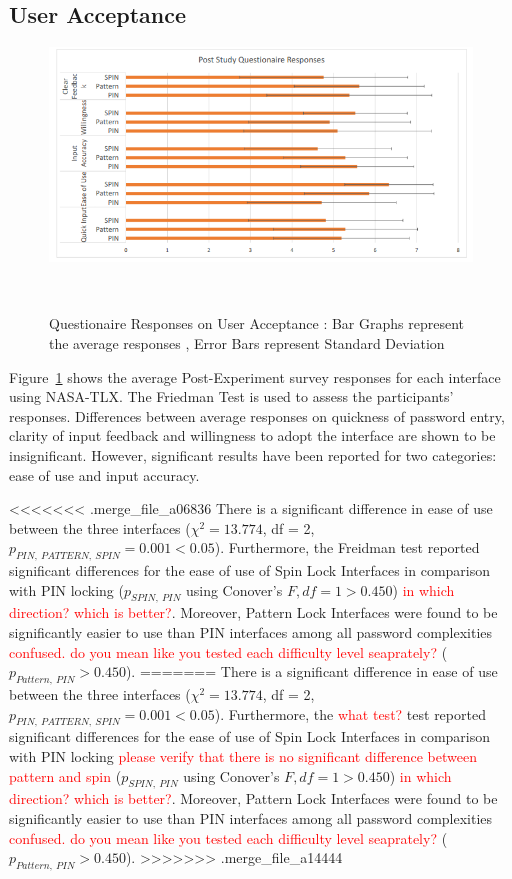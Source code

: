 \documentclass{sigchi}
\newcommand{\comment}[1]{\textcolor{red}{#1}}
\begin{document}
\subsection{User Acceptance}
\begin{figure}[b]
	\centering
	\includegraphics[width=1\columnwidth]{figures/Responses.png}
	\caption{Questionaire Responses on User Acceptance : Bar Graphs represent the average responses , Error Bars represent Standard Deviation}~\label{fig:Responses}
\end{figure}
 Figure~\ref{fig:Responses} shows the average Post-Experiment survey responses for each interface using NASA-TLX.  The Friedman Test is used to assess the participants' responses. Differences between average responses on quickness of password entry, clarity of input feedback and willingness to adopt the interface are shown to be insignificant. However, significant results have been reported for two categories: ease of use and input accuracy.

<<<<<<< .merge_file_a06836
There is a significant difference in ease of use between the three interfaces ($\chi^{2} = 13.774$, df = 2, $p_{PIN,\:PATTERN, \:SPIN} = 0.001 < 0.05$).  Furthermore, the Freidman test reported significant differences for the ease of use of Spin Lock  Interfaces in comparison with PIN locking   ($p_{SPIN,\:PIN}$ using Conover's $F, df = 1 >  0.450$) \comment{in which direction? which is better?}.  Moreover, Pattern Lock Interfaces were found to be significantly easier to use than PIN interfaces among all password complexities \comment{confused. do you mean like you tested each difficulty level seaprately?} ($p_{Pattern,\:PIN} > 0.450$). 
=======
There is a significant difference in ease of use between the three interfaces ($\chi^{2} = 13.774$, df = 2, $p_{PIN,\:PATTERN, \:SPIN} = 0.001 < 0.05$).  Furthermore, the \comment{what test?} test reported significant differences for the ease of use of Spin Lock  Interfaces in comparison with PIN locking \comment{please verify that there is no significant difference between pattern and spin}  ($p_{SPIN,\:PIN}$ using Conover's $F, df = 1 >  0.450$) \comment{in which direction? which is better?}.  Moreover, Pattern Lock Interfaces were found to be significantly easier to use than PIN interfaces among all password complexities \comment{confused. do you mean like you tested each difficulty level seaprately?} ($p_{Pattern,\:PIN} > 0.450$). 
>>>>>>> .merge_file_a14444
\end{document}
